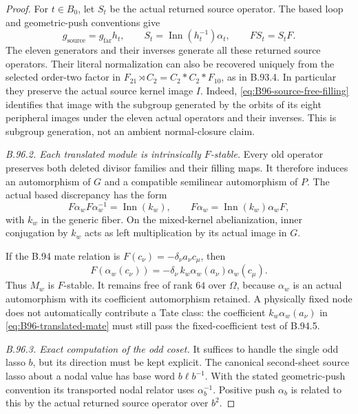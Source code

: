 \begin{proof}
For $t\in B_0$, let $S_t$ be the actual returned source operator.
The based loop and geometric-push conventions give
\begin{equation}\label{eq:B96-source-normalization}
 g_{\mathrm{source}}=g_{\mathrm{far}}h_t,
 \qquad S_t=\operatorname{Inn}(h_t^{-1})\alpha_t,
 \qquad FS_t=S_tF.
\end{equation}
The eleven generators and their inverses generate all these
returned source operators.  Their literal normalization can also
be recovered uniquely from the selected order-two factor in
$F_{21}\rtimes C_2=C_2*C_2*F_{10}$, as in B.93.4.
In particular they preserve the actual source kernel image $I$.
Indeed, \eqref{eq:B96-source-free-filling} identifies that image
with the subgroup generated by the orbits of its eight peripheral
images under the eleven actual operators and their inverses.
This is subgroup generation, not an ambient normal-closure claim.

\emph{B.96.2. Each translated module is intrinsically $F$-stable.}
Every old operator preserves both deleted divisor families and
their filling maps.  It therefore induces an automorphism of $G$
and a compatible semilinear automorphism of $P$.  The actual
based discrepancy has the form
\begin{equation}\label{eq:B96-discrepancy}
 F\alpha_wF\alpha_w^{-1}=\operatorname{Inn}(k_w),
 \qquad F\alpha_w=\operatorname{Inn}(k_w)\alpha_wF,
\end{equation}
with $k_w$ in the generic fiber.  On the mixed-kernel abelianization,
inner conjugation by $k_w$ acts as left multiplication by its
actual image in $G$.

If the B.94 mate relation is
$F(c_\nu)=-\delta_\nu a_\nu c_\mu$, then
\begin{equation}\label{eq:B96-translated-mate}
 F(\alpha_w(c_\nu))=
    -\delta_\nu\,k_w\alpha_w(a_\nu)\alpha_w(c_\mu).
\end{equation}
Thus $M_w$ is $F$-stable.  It remains free of rank $64$ over
$\Omega$, because $\alpha_w$ is an actual automorphism with its
coefficient automorphism retained.  A physically fixed node does
not automatically contribute a Tate class: the coefficient
$k_w\alpha_w(a_\nu)$ in \eqref{eq:B96-translated-mate} must still
pass the fixed-coefficient test of B.94.5.

\emph{B.96.3. Exact computation of the odd coset.}
It suffices to handle the single odd lasso $b$, but its direction
must be kept explicit.  The canonical second-sheet source lasso
about a nodal value has base word $b\ell b^{-1}$.  With the stated
geometric-push convention its transported nodal relator uses
$\alpha_b^{-1}$.  Positive push $\alpha_b$ is related to this
by the actual returned source operator over $b^2$.


\end{proof}
